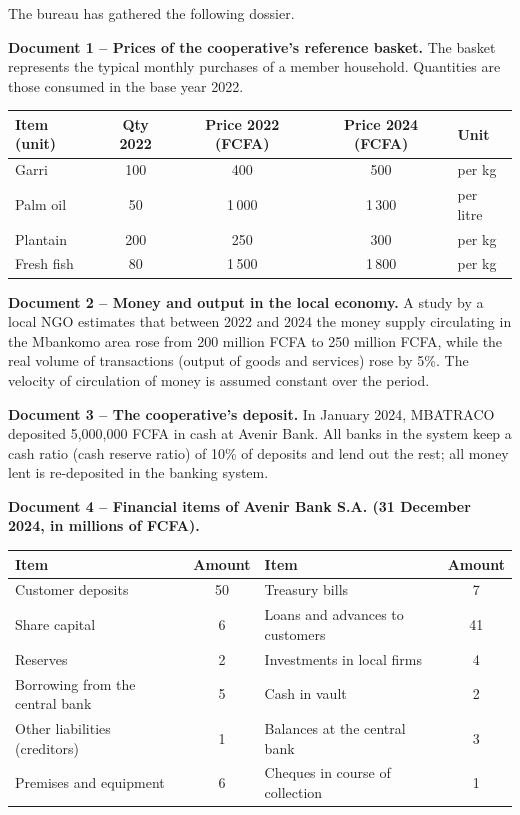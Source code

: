 \documentclass[11pt]{article}
\newcommand{\cle}[1]{{\popxbold\color{popdark}#1}}
\begin{document}
The bureau has gathered the following dossier.

\textbf{Document 1 -- Prices of the cooperative's reference basket.} The basket represents the typical monthly purchases of a member household. Quantities are those consumed in the base year 2022.

\begin{center}
\begin{tabularx}{\linewidth}{|l|c|c|c|X|}
\hline
\rowcolor{popblueL} \textbf{Item (unit)} & \textbf{Qty 2022} & \textbf{Price 2022 (FCFA)} & \textbf{Price 2024 (FCFA)} & \textbf{Unit} \\
\hline
Garri & 100 & 400 & 500 & per kg \\
\hline
Palm oil & 50 & 1\,000 & 1\,300 & per litre \\
\hline
Plantain & 200 & 250 & 300 & per kg \\
\hline
Fresh fish & 80 & 1\,500 & 1\,800 & per kg \\
\hline
\end{tabularx}
\end{center}

\textbf{Document 2 -- Money and output in the local economy.} A study by a local NGO estimates that between 2022 and 2024 the money supply circulating in the Mbankomo area rose from 200 million FCFA to 250 million FCFA, while the real volume of transactions (output of goods and services) rose by 5\%. The velocity of circulation of money is assumed constant over the period.

\textbf{Document 3 -- The cooperative's deposit.} In January 2024, MBATRACO deposited 5,000,000 FCFA in cash at Avenir Bank. All banks in the system keep a \cle{cash ratio} (cash reserve ratio) of 10\% of deposits and lend out the rest; all money lent is re-deposited in the banking system.

\textbf{Document 4 -- Financial items of Avenir Bank S.A. (31 December 2024, in millions of FCFA).}

\begin{center}
\begin{tabularx}{\linewidth}{|X|c|X|c|}
\hline
\rowcolor{popblueL} \textbf{Item} & \textbf{Amount} & \textbf{Item} & \textbf{Amount} \\
\hline
Customer deposits & 50 & Treasury bills & 7 \\
\hline
Share capital & 6 & Loans and advances to customers & 41 \\
\hline
Reserves & 2 & Investments in local firms & 4 \\
\hline
Borrowing from the central bank & 5 & Cash in vault & 2 \\
\hline
Other liabilities (creditors) & 1 & Balances at the central bank & 3 \\
\hline
Premises and equipment & 6 & Cheques in course of collection & 1 \\
\hline
\end{tabularx}
\end{center}
\end{document}
